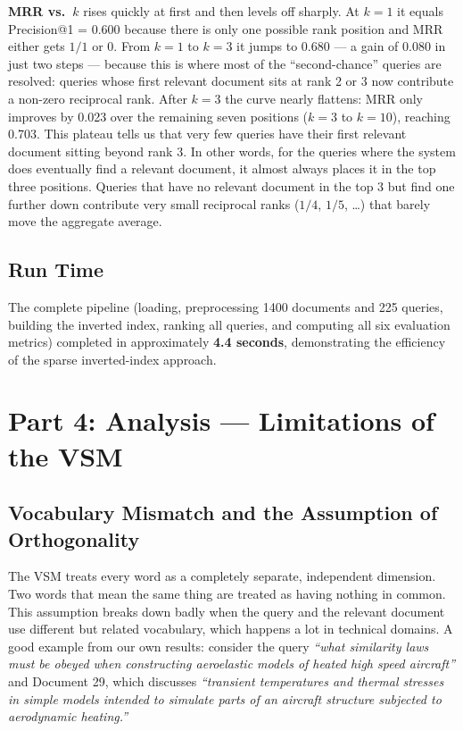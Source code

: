 \documentclass{svproc}
\begin{document}
    \textbf{MRR vs.\ $k$} rises quickly at first and then levels off sharply. At $k{=}1$ it equals Precision@1 = 0.600 because there is only one possible rank position and MRR either gets $1/1$ or $0$. From $k{=}1$ to $k{=}3$ it jumps to 0.680 --- a gain of 0.080 in just two steps --- because this is where most of the ``second-chance'' queries are resolved: queries whose first relevant document sits at rank 2 or 3 now contribute a non-zero reciprocal rank. After $k{=}3$ the curve nearly flattens: MRR only improves by 0.023 over the remaining seven positions ($k{=}3$ to $k{=}10$), reaching 0.703. This plateau tells us that very few queries have their first relevant document sitting beyond rank 3. In other words, for the queries where the system does eventually find a relevant document, it almost always places it in the top three positions. Queries that have no relevant document in the top 3 but find one further down contribute very small reciprocal ranks ($1/4$, $1/5$, \ldots) that barely move the aggregate average.

    \subsection{Run Time}

    The complete pipeline (loading, preprocessing 1400 documents and 225 queries, building the inverted index, ranking all queries, and computing all six evaluation metrics) completed in approximately \textbf{4.4 seconds}, demonstrating the efficiency of the sparse inverted-index approach.

    \FloatBarrier
    \section{Part 4: Analysis — Limitations of the VSM}

    \subsection{Vocabulary Mismatch and the Assumption of Orthogonality}

    The VSM treats every word as a completely separate, independent dimension. Two words that mean the same thing are treated as having nothing in common. This assumption breaks down badly when the query and the relevant document use different but related vocabulary, which happens a lot in technical domains. A good example from our own results: consider the query \textit{``what similarity laws must be obeyed when constructing aeroelastic models of heated high speed aircraft''} and Document 29, which discusses \textit{``transient temperatures and thermal stresses in simple models intended to simulate parts of an aircraft structure subjected to aerodynamic heating.''}
\end{document}
